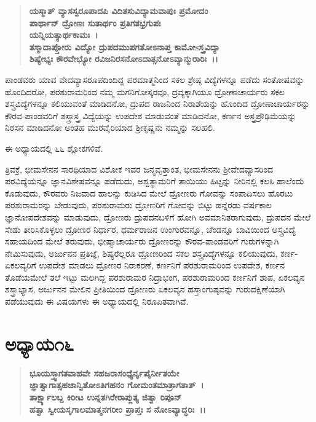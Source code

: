 \begin{verse}
\textbf{ಯಸ್ಮಾತ್ ವ್ಯಾಸಸ್ವರೂಪಾದಪಿ ವಿದಿತಸುವಿದ್ಯಾಮವಾಪುಃ ಪ್ರಮೋದಂ}\\\textbf{ಪಾರ್ಥಾನ್ ದ್ರೋಣಃ ಸುತಾರ್ಥಂ ಪ್ರತಿಗತಭ್ರಗುಪಃ }\\\textbf{ಯನ್ನಿಯತ್ಯಾರ್ಥಕಾಮಃ~।} \\\textbf{ತಸ್ಮಾದಾಪ್ತೋರು ವಿದ್ಯೋ ದ್ರುಪದಮುಪಗತೋಽನಾಪ್ತ ಕಾಮೋsಸ್ತ್ರವಿದ್ಯಾ} \\\textbf{ಶಿಷ್ಯೇಭ್ಯಃ ಕೌರವೇಭ್ಯೋ ರವಿಜನಿರಸನೋಽದಾತ್ಸನೋಽವ್ಯಾನ್ಮುರಾರಿಃ~।।}
\end{verse}

ಪಾಂಡವರು ಯಾವ ವೇದವ್ಯಾಸರೂಪದಿಂದಿದ್ದ ಪರಮಾತ್ಮನಿಂದ ಸಕಲ ಶ್ರೇಷ್ಠ ವಿದ್ಯೆಗಳನ್ನೂ ಪಡೆದು ಸಂತೋಷವನ್ನು ಹೊಂದಿದರೋ, ಪರಶುರಾಮರಿಂದ ನಮ್ಮ ಮಗನಿಗೋಸ್ಕರವೂ, ದ್ರವ್ಯಕ್ಕಾಗಿಯೂ ದ್ರೋಣಾಚಾರ್ಯರು ಸಕಲ ಶಸ್ತ್ರವಿದ್ಯೆಗಳನ್ನೂ ಕಲಿಯುವಂತೆ ಮಾಡಿದನೋ, ದ್ರುಪದ ರಾಜನಿಂದ ನಿರಾಶೆಯನ್ನು ಹೊಂದಿದ ದ್ರೋಣಾಚಾರ್ಯರನ್ನು ಕೌರವ-ಪಾಂಡವರಿಗೆ ಶಸ್ತ್ರಾಸ್ತ್ರ ವಿದ್ಯೆಯನ್ನು ಉಪದೇಶ ಮಾಡುವಂತೆ ಮಾಡಿದನೋ, ಕರ್ಣನ ಅಸ್ತ್ರಪ್ರೌಢಿಮೆಯನ್ನು ನಿರಸನ ಮಾಡಿದನೋ ಅಂತಹ ಮುರವೈರಿಯಾದ ಶ‍್ರೀಕೃಷ್ಣನು ನಮ್ಮನ್ನು ಸಲಹಲಿ.

\vskip 4pt

ಈ ಅಧ್ಯಾಯದಲ್ಲಿ ೬೬ ಶ್ಲೋಕಗಳಿವೆ.

\vskip 2pt

ತ್ರಿವಕ್ರೆ, ಭೀಮಸೇನನ ಸಾರಥಿಯಾದ ವಿಶೋಕ ಇವರ ಜನ್ಮವೃತ್ತಾಂತ, ಭೀಮಸೇನನು ಶ‍್ರೀವೇದವ್ಯಾಸರಿಂದ ಪರವಿದ್ಯೆಯನ್ನೂ ಜ್ಞಾನವಿಶೇಷವನ್ನೂ ಪಡೆದುದು, ಅಶ್ವತ್ಥಾಮರಿಗೆ ತಾಯಿಯು ಹಿಟ್ಟನ್ನು ನೀರಿನಲ್ಲಿ ಕಲಸಿ ಹಾಲೆಂದು ಕೊಡುವುದು, ಕೌರವರು ನಿಜವಾದ ಹಾಲನ್ನು ಕುಡಿಸಿದ ಮೇಲೆ ದ್ರೋಣರು ಗೋವನ್ನು ಸಂಪಾದಿಸಲು ಹೊರಟು ಪರಶುರಾಮರನ್ನು ಬೇಡುವುದು, ಪರಶುರಾಮರು ದ್ರೋಣರಿಗೆ ಗೋವನ್ನು ಬಿಟ್ಟು ಹನ್ನೆರಡು ವರ್ಷಕಾಲ ಜ್ಞಾನೋಪದೇಶವನ್ನು ಮಾಡುವುದು, ದ್ರೋಣರು ದ್ರುಪದನಬಳಿಗೆ ಹೋಗಿ ಅವಮಾನಿತರಾಗುವುದು, ದ್ರುಪದನ ಮೇಲೆ ಸೇಡು ತೀರಿಸಿಕೊಳ್ಳಲು ದ್ರೋಣರ ನಿರ್ಧಾರ, ಧರ್ಮರಾಜನ ಉಂಗುರವನ್ನೂ, ಚೆಂಡನ್ನೂ ಬಾವಿಯಿಂದ ಅಸ್ತ್ರವಿದ್ಯೆ ಸಹಾಯದಿಂದ ಮೇಲೆ ತರುವುದು, ಭೀಷ್ಮಾಚಾರ್ಯರು ದ್ರೋಣರನ್ನು ಕೌರವ-ಪಾಂಡವರಿಗೆ ಗುರುಗಳನ್ನಾಗಿ ನೇಮಿಸುವುದು, ಅರ್ಜುನನ ಪ್ರತಿಜ್ಞೆ, ಶಿಷ್ಯರೆಲ್ಲರೂ ದ್ರೋಣರಿಂದ ಸಕಲ ಶಸ್ತ್ರವಿದ್ಯೆಗಳನ್ನೂ ಕಲಿಯುವುದು, ಕರ್ಣ-ಏಕಲವ್ಯರಿಗೆ ಉಪದೇಶ ಮಾಡಲು ದ್ರೋಣರ ನಿರಾಕರಣೆ, ಕರ್ಣನಿಗೆ ಪರಶುರಾಮರಿಂದ ಉಪದೇಶ, ಕರ್ಣನ ತೊಡೆಯಮೇಲೆ ತಲೆ ಇಟ್ಟು ಮಲಗಿದ್ದ ಪರಶುರಾಮರ ನಿದ್ರಾಭಂಗ, ಪರಶುರಾಮರಿಂದ ಕರ್ಣನಿಗೆ ಶಾಪ, ಏಕಲವ್ಯನ ಶಸ್ತ್ರಾಭ್ಯಾಸ, ಅರ್ಜುನನ ಮೇಲಿನ ಪ್ರೀತಿಯಿಂದ ದ್ರೋಣರು ಏಕಲವ್ಯನ ಹಸ್ತಾಂಗುಷ್ಠವನ್ನು ಗುರುದಕ್ಷಿಣೆಯಾಗಿ ಪಡೆಯುವುದು ಈ ವಿಷಯಗಳು ಈ ಅಧ್ಯಾಯದಲ್ಲಿ ನಿರೂಪಿತವಾಗಿವೆ.

\vskip 2pt

\section*{ಅಧ್ಯಾಯ\enginline{-}೧೬}

\begin{verse}
\textbf{ಭೂಯಸ್ತ್ವಾಗತವಾಹವೇ ಸಹಜರಾಸಂಧ್ಯೆರ್ನೃಪೈರ್ನೀತಯೇ }\\\textbf{ಜ್ಞಾತ್ವಾಗಾತ್ಸಹಜಾನ್ವಿತೋಽತಿಗಹನಂ ಗೋಮಂತಮಾತ್ರಾಗತಾತ್~।}\\\textbf{ತಾರ್ಕ್ಷ್ಯಾಲಬ್ದ ಕಿರೀಟ ಉನ್ನತಗಿರೇರಾಪ್ಲುತ್ಯ ಜಿತ್ವಾ ರಿಪೂನ್}\\\textbf{ಹತ್ವಾ ಸ್ವೀಯಸೃಗಾಲಮಾತ್ಮನಗರೀಂ ಪ್ರಾಪ್ತಃ ಸ ನೋಽವ್ಯಾದ್ಧರಿಃ~।।}
\end{verse}

